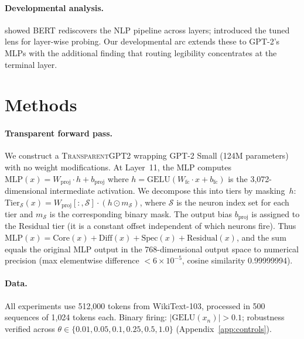 \documentclass{article}
\begin{document}
\paragraph{Developmental analysis.}
\citet{tenney2019bert} showed BERT rediscovers the NLP pipeline across layers;
\citet{belrose2023eliciting} introduced the tuned lens for layer-wise probing.
Our developmental arc extends these to GPT-2's MLPs with the additional
finding that routing legibility concentrates at the terminal layer.

\section{Methods}

\paragraph{Transparent forward pass.}
We construct a \textsc{TransparentGPT2} wrapping GPT-2 Small (124M parameters)
with no weight modifications.
At Layer~11, the MLP computes $\text{MLP}(x) = W_\text{proj} \cdot h + b_\text{proj}$
where $h = \text{GELU}(W_\text{fc} \cdot x + b_\text{fc})$ is the 3{,}072-dimensional
intermediate activation.
We decompose this into tiers by masking~$h$:
$\text{Tier}_\mathcal{S}(x) = W_\text{proj}[:, \mathcal{S}] \cdot (h \odot m_\mathcal{S})$,
where $\mathcal{S}$ is the neuron index set for each tier and $m_\mathcal{S}$ is
the corresponding binary mask.
The output bias $b_\text{proj}$ is assigned to the Residual tier (it is a
constant offset independent of which neurons fire).
Thus $\text{MLP}(x) = \text{Core}(x) + \text{Diff}(x) + \text{Spec}(x) + \text{Residual}(x)$,
and the sum equals the original MLP output in the 768-dimensional output space
to numerical precision
(max elementwise difference $< 6 \times 10^{-5}$, cosine similarity 0.99999994).

\paragraph{Data.}
All experiments use 512{,}000 tokens from WikiText-103, processed in 500
sequences of 1{,}024 tokens each.
Binary firing: $|\text{GELU}(x_n)| > 0.1$; robustness verified across
$\theta \in \{0.01, 0.05, 0.1, 0.25, 0.5, 1.0\}$ (Appendix~\ref{app:controls}).
\end{document}
